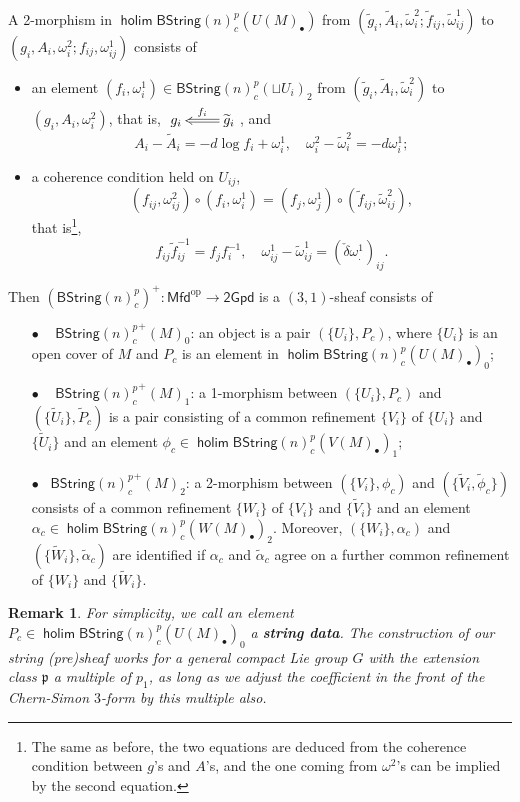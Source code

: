 \documentclass[letterpaper,10pt, oneside]{article} %
\newtheorem{rmk}[thm]{Remark}
\newcommand{\Mfd}{\mathsf{Mfd}}%
\newcommand{\tGpd}{\mathsf{2Gpd}}%
\newcommand{\bstringnp}{\mathsf{BString}(n)^p_{c}} %
\newcommand{\bstringnpp}{{\mathsf{BString}(n)^p_{c}}^+} %
\DeclareMathOperator{\holim}{\mathsf{holim}}
\newcommand{\op}{\mathrm{op}}%
\newcommand{\frkp}{\mathfrak p}
\newcommand{\pp}{\frkp} %
\newcommand{\tg}{\widetilde{g}}
\newcommand{\tf}{\widetilde{f}}
\newcommand{\tA}{\widetilde{A}}
\newcommand{\tomega}{\widetilde{\omega}}
\begin{document}
A 2-morphism in $\holim \bstringnp(U(M)_\bullet)$ from $(\tg_i, \tA_i,
\tomega^2_i ; \tf_{ij}, \tomega^1_{ij} )$ to $(g_i, A_i, \omega^2_i;
f_{ij}, \omega_{ij}^1) $ consists of
\begin{itemize}
\item an element $(f_i, \omega^1_i) \in \bstringnp(\sqcup U_i)_2 $
  from $(\tg_i, \tA_i, \tomega^2_i) $ to $(g_i, A_i, \omega^2_i)$, that is, $\xymatrix{g_i &
    \ar@{=>}[l]_{f_i}\tg_i} $, and
\[
A_i -\tA_i = -d\log f_{i} + \omega^1_i, \quad
\omega^2_{i}-\tomega^2_{i} =-d\omega^1_{i};
\]
\item a coherence condition held on $U_{ij}$,
\[
(f_{ij} , \omega^2_{ij}) \circ  (f_i , \omega_i^1) = (f_j, \omega^1_j) \circ (\tf_{ij}, \tomega_{ij}^2),
\]
that is\footnote{The same as before, the two equations
  are deduced from the coherence condition between $g$'s and $A$'s, and the one coming from
  $\omega^2$'s can be implied by the second equation.},
\[
f_{ij} \tf_{ij}^{-1}=  f_j f_i^{-1}, \quad \omega^1_{ij} - \tomega^1_{ij}  = (\check{\delta} \omega_{.}^1)_{ij}.
\]
\end{itemize}


Then $(\bstringnp)^+: \Mfd^{\op} \to \tGpd$ is a $(3,1)$-sheaf consists of
\begin{itemize}
\item[$\bullet$]~ $\bstringnpp(M)_0$: an object is a pair $(\{U_i\},
  P_{c})$, where $\{U_i\}$ is an open cover of $M$ and $P_{c}$
  is an element in $\holim \bstringnp(U(M)_\bullet)_0$;
\item[$\bullet$]~ $\bstringnpp(M)_1$: a 1-morphism between $(\{ U_i \},
  P_{c})$ and $(\{\widetilde{U}_i\},\widetilde{P}_{c})$ is a pair consisting of  a common refinement $\{V_i\}$ of
  $\{U_i\}$ and $\{\widetilde{U}_i\}$ and an element $\phi_{c} \in \holim \bstringnp(V(M)_\bullet)_1$;
\item[$\bullet$]~$\bstringnpp(M)_2 $: a 2-morphism between $(\{V_i \}, \phi_{c})$
  and $(\{\widetilde{V}_i,\widetilde{\phi}_c \})$ consists of a common refinement $\{
  W_i \} $ of $\{V_i \}$
  and $\{ \widetilde{V}_i \}$ and an element $\alpha_{c} \in \holim
  \bstringnp(W(M)_\bullet)_2$. Moreover, $(\{ W_i \}, \alpha_{c})$ and
  $(\{ \widetilde{W}_i \}, \widetilde{\alpha}_{c})$ are identified if  $\alpha_{c}$ and
  $\widetilde{\alpha}_{c}$ agree on a further
  common refinement of $\{W_i \}$ and $\{ \widetilde{W}_i \}$.
\end{itemize}

\begin{rmk}
For simplicity, we call an element $P_c \in \holim \bstringnp(U(M)_\bullet)_0$ a {\bf string data}. The construction of our string (pre)sheaf works for a general compact Lie group $G$ with the extension class $\pp$ a multiple of $p_1$, as long as we adjust  the coefficient in the front of the Chern-Simon $3$-form  by this multiple also.
\end{rmk}
\end{document}
